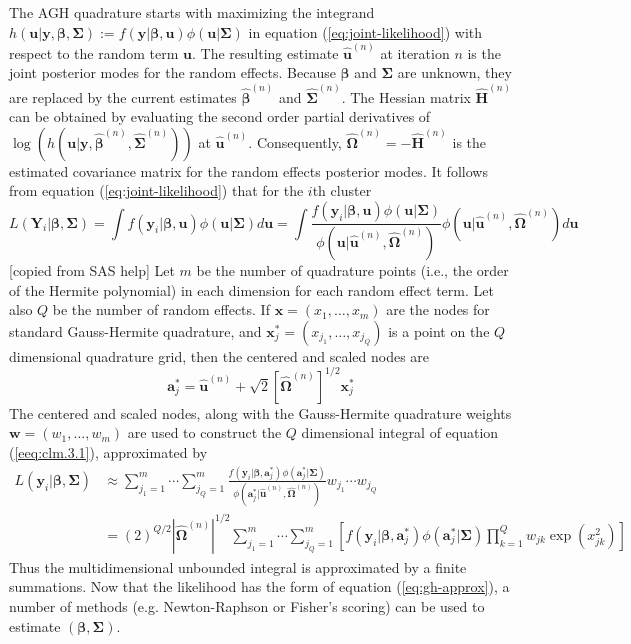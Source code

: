 The AGH quadrature starts with maximizing the integrand $h(\bm u|\bm y, \bm \beta, \bm \Sigma) :=
f(\bm y|\bm \beta, \bm u)\phi(\bm u|\bm \Sigma)$ in equation (\ref{eq:joint-likelihood}) with
respect to the random term $\bm u$. The resulting estimate $\hat{\bm u}^{(n)}$ at iteration $n$ is
the joint posterior modes for the random effects. Because $\bm \beta$ and $\bm \Sigma$ are unknown,
they are replaced by the current estimates $\hat{\bm \beta}^{(n)}$ and $\hat{\bm \Sigma}^{(n)}$. The
Hessian matrix $\hat{\bm H}^{(n)}$ can be obtained by evaluating the second order partial
derivatives of $\log(h(\bm u|\bm y, \hat{\bm \beta}^{(n)}, \hat{\bm \Sigma}^{(n)}))$ at $\hat{\bm
	u}^{(n)}$. Consequently, $\hat{\bm \Omega}^{(n)} =-\hat{\bm H}^{(n)} $ is the estimated covariance
matrix for the random effects posterior modes. It follows from equation (\ref{eq:joint-likelihood})
that for the $i$th cluster 
\begin{equation}\label{eeq:clm.3.1}
	L( \bm Y_i|\bm \beta, \bm \Sigma) = \int f(\bm y_i|\bm \beta, \bm u )\phi(\bm u|\bm\Sigma)d\bm u =
	\int \frac{f(\bm y_i|\bm \beta, \bm u )\phi(\bm u|\bm\Sigma)}{\phi(\bm u|\hat{\bm
			u}^{(n)},\hat{\bm \Omega}^{(n)} )}\phi(\bm u|\hat{\bm u}^{(n)},\hat{\bm \Omega}^{(n)} )d\bm u
\end{equation}
[copied from SAS help] Let $m$ be the number of quadrature points (i.e., the order of the Hermite
polynomial) in each dimension for each random effect term. Let also $Q$ be the number of random
effects. If $\bm x = (x_1, \ldots, x_m)$ are the nodes for standard Gauss-Hermite quadrature, and
$\bm x^{\ast}_j=(x_{j_1}, \ldots, x_{j_Q}) $ is a point on the $Q$ dimensional quadrature grid, then
the centered and scaled nodes are 
\begin{equation}\label{1.3.2}
	\bm  a_j^{\ast} = \hat{\bm u}^{(n)} + \sqrt{2} [\hat{\bm \Omega}^{(n)} ]^{1/2}\bm x^{\ast}_j
\end{equation}
The centered and scaled nodes, along with the Gauss-Hermite quadrature weights $\bm w = (w_1,
\ldots, w_m)$ are used to construct the $Q$ dimensional integral of equation (\ref{eeq:clm.3.1}),
approximated by 
\begin{equation}\label{eq:gh-approx}
	\begin{aligned}
		L(\bm y_i|\bm\beta, \bm \Sigma) &\approx\sum_{j_1=1}^m\cdots \sum_{j_Q=1}^m\frac{f(\bm y_i|\bm
			\beta, \bm  a_j^{\ast})\phi(\bm  a_j^{\ast}|\bm\Sigma)}{\phi(\bm  a_j^{\ast}|\hat{\bm
				u}^{(n)},\hat{\bm \Omega}^{(n)} )}w_{j_1}\cdots w_{j_Q}\\
		& = (2)^{Q/2}|\hat{\bm \Omega}^{(n)}|^{1/2}\sum_{j_1=1}^m\cdots \sum_{j_Q=1}^m\left[ f(\bm y_i|\bm
		\beta, \bm  a_j^{\ast} )\phi(\bm  a_j^{\ast}|\bm\Sigma) \prod_{k=1}^Qw_{jk}\exp(x_{jk}^2)\right]
	\end{aligned}
\end{equation}
Thus the multidimensional unbounded integral is approximated by a finite summations. Now that the
likelihood has the form of equation (\ref{eq:gh-approx}), a number of methods (e.g. Newton-Raphson
or Fisher's scoring) can be used to estimate $(\bm \beta,  \bm \Sigma)$. 

